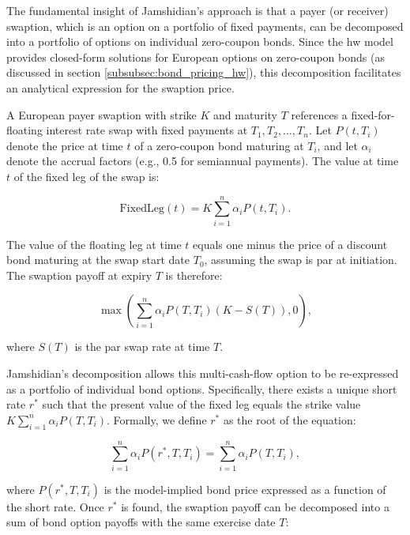 The fundamental insight of Jamshidian's approach is that a payer (or receiver) swaption, which is an option on a portfolio of fixed payments, can be decomposed into a portfolio of options on individual zero-coupon bonds. Since the \ac{hw} model provides closed-form solutions for European options on zero-coupon bonds (as discussed in section \ref{subsubsec:bond_pricing_hw}), this decomposition facilitates an analytical expression for the swaption price.

A European payer swaption with strike \( K \) and maturity \( T \) references a fixed-for-floating interest rate swap with fixed payments at \( T_1, T_2, \dots, T_n \). Let \( P(t, T_i) \) denote the price at time \( t \) of a zero-coupon bond maturing at \( T_i \), and let \( \alpha_i \) denote the accrual factors (e.g., 0.5 for semiannual payments). The value at time \( t \) of the fixed leg of the swap is:

\begin{equation}
	\text{FixedLeg}(t) = K \sum_{i=1}^n \alpha_i P(t, T_i).
\end{equation}

The value of the floating leg at time \( t \) equals one minus the price of a discount bond maturing at the swap start date \( T_0 \), assuming the swap is par at initiation. The swaption payoff at expiry \( T \) is therefore:

\begin{equation}
	\max\left( \sum_{i=1}^n \alpha_i P(T, T_i) (K - S(T)), 0 \right),
\end{equation}

where \( S(T) \) is the par swap rate at time \( T \).

Jamshidian's decomposition allows this multi-cash-flow option to be re-expressed as a portfolio of individual bond options. Specifically, there exists a unique short rate \( r^* \) such that the present value of the fixed leg equals the strike value \( K \sum_{i=1}^n \alpha_i P(T, T_i) \). Formally, we define \( r^* \) as the root of the equation:

\begin{equation}
	\sum_{i=1}^n \alpha_i P(r^*, T, T_i) = \sum_{i=1}^n \alpha_i P(T, T_i),
\end{equation}

where \( P(r^*, T, T_i) \) is the model-implied bond price expressed as a function of the short rate. Once \( r^* \) is found, the swaption payoff can be decomposed into a sum of bond option payoffs with the same exercise date \( T \):

